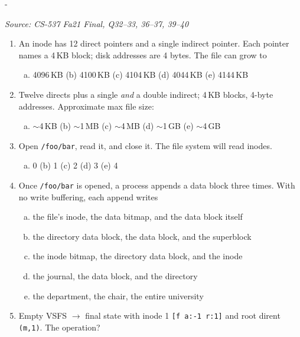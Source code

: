 \documentclass[11pt,a4paper]{article}
\makeatletter
\newcommand{\keepspace}[1]{\par\penalty-100\begingroup
  \setlength{\dimen@}{#1}\dimen@ii\pagegoal\advance\dimen@ii-\pagetotal
  \ifdim\dimen@>\dimen@ii\ifdim\dimen@ii>\z@\vfil\fi\break\fi\endgroup}
\newcounter{qn}[section]
\newenvironment{Qn}[4]{%
  \refstepcounter{qn}\keepspace{7\baselineskip}%
  \begin{tcolorbox}[qboxstyle, title={Q\thesection.\theqn\ \ [#1 \textbar\ #2]\ \ #4}]%
  {\footnotesize\color{g3}\textit{Source: #3}}\par\smallskip%
}{%
  \end{tcolorbox}%
}
\makeatother
\begin{document}
\begin{Qn}{Medium-Hard}{Lect 24}{CS-537 Fa21 Final, Q32--33, 36--37, 39--40}{VSFS size, open/append I/O, and simulator ops}
\begin{enumerate}[(32)]
\item An inode has 12 direct pointers and a single indirect pointer.
      Each pointer names a 4\,KB block; disk addresses are 4 bytes.
      The file can grow to
      \begin{enumerate}[(a)]
      \item 4096\,KB \quad (b) 4100\,KB \quad (c) 4104\,KB \quad
      (d) 4044\,KB \quad (e) 4144\,KB
      \end{enumerate}
\item Twelve directs plus a single \emph{and} a double indirect; 4\,KB
      blocks, 4-byte addresses. Approximate max file size:
      \begin{enumerate}[(a)]
      \item $\sim$4\,KB \quad (b) $\sim$1\,MB \quad (c) $\sim$4\,MB \quad
      (d) $\sim$1\,GB \quad (e) $\sim$4\,GB
      \end{enumerate}
\item Open \texttt{/foo/bar}, read it, and close it. The file system will
      read \underline{\hspace{1.2em}} inodes.
      \begin{enumerate}[(a)]
      \item 0 \quad (b) 1 \quad (c) 2 \quad (d) 3 \quad (e) 4
      \end{enumerate}
\item Once \texttt{/foo/bar} is opened, a process appends a data block
      three times. With no write buffering, each append writes
      \begin{enumerate}[(a)]
      \item the file's inode, the data bitmap, and the data block itself
      \item the directory data block, the data block, and the superblock
      \item the inode bitmap, the directory data block, and the inode
      \item the journal, the data block, and the directory
      \item the department, the chair, the entire university
      \end{enumerate}
\item Empty VSFS $\to$ final state with inode 1
      \texttt{[f a:-1 r:1]} and root dirent \texttt{(m,1)}. The operation?

\end{enumerate}
\end{Qn}
\end{document}
